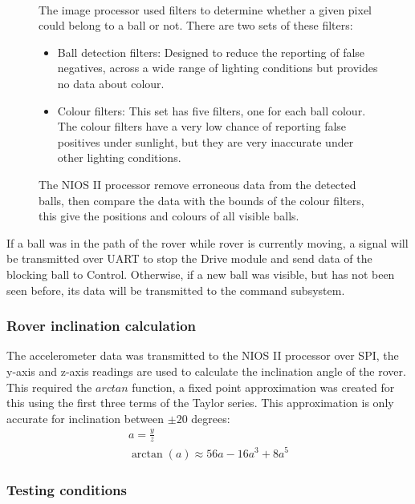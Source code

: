 \documentclass[11pt, a4paper]{article}
\begin{document}
\begin{figure}[ht]
\begin{minipage}[t]{0.5\linewidth}
        \\
        The image processor used filters to determine whether a given pixel could belong to a ball or not. There are two sets of these filters:
        \begin{itemize}
            \item Ball detection filters: Designed to reduce the reporting of false negatives, across a wide range of lighting conditions but provides no data about colour.
            \item Colour filters: This set has five filters, one for each ball colour. The colour filters have a very low chance of reporting false positives under sunlight, but they are very inaccurate under other lighting conditions.
        \end{itemize}
        
        The NIOS II processor remove erroneous data from the detected balls, then compare the data with the bounds of the colour filters, this give the positions and colours of all visible balls. 
    \end{minipage}
\end{figure}

If a ball was in the path of the rover while rover is currently moving, a signal will be transmitted over UART to stop the Drive module and send data of the blocking ball to Control. Otherwise, if a new ball was visible, but has not been seen before, its data will be transmitted to the command subsystem.

\subsubsection{Rover inclination calculation}

The accelerometer data was transmitted to the NIOS II processor over SPI, the y-axis and z-axis readings are used to calculate the inclination angle of the rover. This required the $arctan$ function, a fixed point approximation was created for this using the first three terms of the Taylor series. This approximation is only accurate for inclination between $\pm 20$ degrees:
\begin{gather*}
    a = \frac{y}{z} \\
    \arctan(a) \approx 56a - 16a^3 + 8a^5
\end{gather*}

\subsubsection{Testing conditions}
\end{document}
